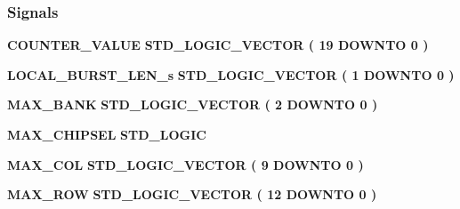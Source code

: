\subsubsection*{Signals}
 \begin{DoxyCompactItemize}
\item 
{\bf C\+O\+U\+N\+T\+E\+R\+\_\+\+V\+A\+L\+UE} {\bfseries \textcolor{comment}{S\+T\+D\+\_\+\+L\+O\+G\+I\+C\+\_\+\+V\+E\+C\+T\+OR}\textcolor{vhdlchar}{ }\textcolor{vhdlchar}{(}\textcolor{vhdlchar}{ }\textcolor{vhdlchar}{ } \textcolor{vhdldigit}{19} \textcolor{vhdlchar}{ }\textcolor{keywordflow}{D\+O\+W\+N\+TO}\textcolor{vhdlchar}{ }\textcolor{vhdlchar}{ } \textcolor{vhdldigit}{0} \textcolor{vhdlchar}{ }\textcolor{vhdlchar}{)}\textcolor{vhdlchar}{ }} 
\item 
{\bf L\+O\+C\+A\+L\+\_\+\+B\+U\+R\+S\+T\+\_\+\+L\+E\+N\+\_\+s} {\bfseries \textcolor{comment}{S\+T\+D\+\_\+\+L\+O\+G\+I\+C\+\_\+\+V\+E\+C\+T\+OR}\textcolor{vhdlchar}{ }\textcolor{vhdlchar}{(}\textcolor{vhdlchar}{ }\textcolor{vhdlchar}{ } \textcolor{vhdldigit}{1} \textcolor{vhdlchar}{ }\textcolor{keywordflow}{D\+O\+W\+N\+TO}\textcolor{vhdlchar}{ }\textcolor{vhdlchar}{ } \textcolor{vhdldigit}{0} \textcolor{vhdlchar}{ }\textcolor{vhdlchar}{)}\textcolor{vhdlchar}{ }} 
\item 
{\bf M\+A\+X\+\_\+\+B\+A\+NK} {\bfseries \textcolor{comment}{S\+T\+D\+\_\+\+L\+O\+G\+I\+C\+\_\+\+V\+E\+C\+T\+OR}\textcolor{vhdlchar}{ }\textcolor{vhdlchar}{(}\textcolor{vhdlchar}{ }\textcolor{vhdlchar}{ } \textcolor{vhdldigit}{2} \textcolor{vhdlchar}{ }\textcolor{keywordflow}{D\+O\+W\+N\+TO}\textcolor{vhdlchar}{ }\textcolor{vhdlchar}{ } \textcolor{vhdldigit}{0} \textcolor{vhdlchar}{ }\textcolor{vhdlchar}{)}\textcolor{vhdlchar}{ }} 
\item 
{\bf M\+A\+X\+\_\+\+C\+H\+I\+P\+S\+EL} {\bfseries \textcolor{comment}{S\+T\+D\+\_\+\+L\+O\+G\+IC}\textcolor{vhdlchar}{ }} 
\item 
{\bf M\+A\+X\+\_\+\+C\+OL} {\bfseries \textcolor{comment}{S\+T\+D\+\_\+\+L\+O\+G\+I\+C\+\_\+\+V\+E\+C\+T\+OR}\textcolor{vhdlchar}{ }\textcolor{vhdlchar}{(}\textcolor{vhdlchar}{ }\textcolor{vhdlchar}{ } \textcolor{vhdldigit}{9} \textcolor{vhdlchar}{ }\textcolor{keywordflow}{D\+O\+W\+N\+TO}\textcolor{vhdlchar}{ }\textcolor{vhdlchar}{ } \textcolor{vhdldigit}{0} \textcolor{vhdlchar}{ }\textcolor{vhdlchar}{)}\textcolor{vhdlchar}{ }} 
\item 
{\bf M\+A\+X\+\_\+\+R\+OW} {\bfseries \textcolor{comment}{S\+T\+D\+\_\+\+L\+O\+G\+I\+C\+\_\+\+V\+E\+C\+T\+OR}\textcolor{vhdlchar}{ }\textcolor{vhdlchar}{(}\textcolor{vhdlchar}{ }\textcolor{vhdlchar}{ } \textcolor{vhdldigit}{12} \textcolor{vhdlchar}{ }\textcolor{keywordflow}{D\+O\+W\+N\+TO}\textcolor{vhdlchar}{ }\textcolor{vhdlchar}{ } \textcolor{vhdldigit}{0} \textcolor{vhdlchar}{ }\textcolor{vhdlchar}{)}\textcolor{vhdlchar}{ }} 

\end{DoxyCompactItemize}
